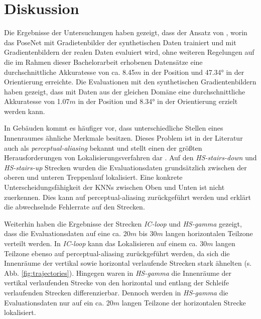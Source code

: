 
\section{Diskussion}
\label{sec:kapitel_5}


Die Ergebnisse der Untersuchungen haben gezeigt, dass der Ansatz von \citet{acharyaBIMPoseNetIndoorCamera2019}, worin das PoseNet mit Gradietenbilder der synthetischen Daten trainiert und mit Gradientenbildern der realen Daten evaluiert wird, ohne weiteren Regelungen auf die im Rahmen dieser Bachelorarbeit erhobenen Datensätze eine durchschnittliche Akkuratesse von ca. 8.45$m$ in der Position und 47.34° in der Orientierung erreichte. Die Evaluationen mit den synthetischen Gradientenbildern haben gezeigt, dass mit Daten aus der gleichen Domäne eine durchschnittliche Akkuratesse von 1.07$m$ in der Position und 8.34° in der Orientierung erzielt werden kann. 

In Gebäuden kommt es häufiger vor, dass unterschiedliche Stellen eines Innenraumes ähnliche Merkmale besitzen. Dieses Problem ist in der Literatur auch als \textit{perceptual-aliasing} bekannt und stellt einen der größten Herausforderungen von Lokalisierungsverfahren dar \cite{lowryVisualPlaceRecognition2016}. Auf den \textit{HS-stairs-down} und \textit{HS-stairs-up} Strecken wurden die Evaluationsdaten grundsätzlich zwischen der oberen und unteren Treppenlauf lokalisiert. Eine konkrete Unterscheidungsfähigkeit der KNNs zwischen Oben und Unten ist nicht zuerkennen. Dies kann auf perceptual-aliasing zurückgeführt werden und erklärt die abwechselnde Fehlerrate auf den Strecken.

Weiterhin haben die Ergebnisse der Strecken \textit{IC-loop} und \textit{HS-gamma} gezeigt, dass die Evaluationsdaten auf eine ca. 20$m$ bis 30$m$ langen horizontalen Teilzone verteilt werden. In \textit{IC-loop} kann das Lokalisieren auf einem ca. 30$m$ langen Teilzone ebenso auf perceptual-aliasing zurückgeführt werden, da sich die Innenräume der vertikal sowie horizontal verlaufende Strecken stark ähnelten (s. Abb. \ref{fig:trajectories}). Hingegen waren in \textit{HS-gamma} die Innenräume der vertikal verlaufenden Strecke von den horizontal und entlang der Schleife verlaufenden Strecken differenzierbar. Dennoch werden in \textit{HS-gamma} die Evaluationsdaten nur auf ein ca. 20$m$ langen Teilzone der horizontalen Strecke lokalisiert.




